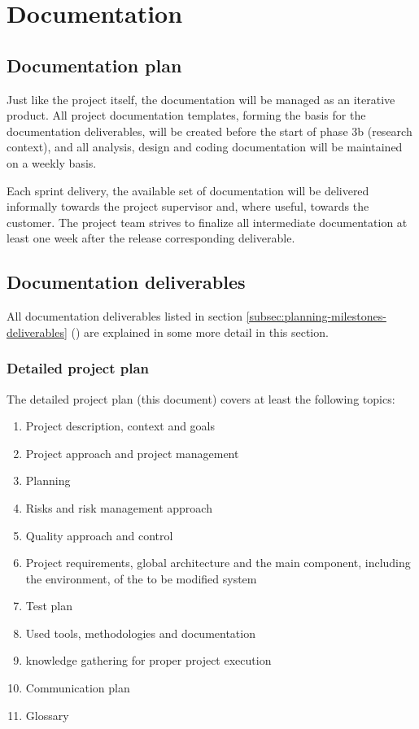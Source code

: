
\section{Documentation}
\label{sec:documentation}
\subsection{Documentation plan}
Just like the project itself, the documentation will be managed as an iterative product.
All project documentation templates, forming the basis for the documentation deliverables, will be created before the start of phase 3b (research context), and all analysis, design and coding documentation will be maintained on a weekly basis.

Each sprint delivery, the available set of documentation will be delivered informally towards the project supervisor and, where useful, towards the customer.
The project team strives to finalize all intermediate documentation at least one week after the release corresponding deliverable.

\subsection{Documentation deliverables}
All documentation deliverables listed in section \ref{subsec:planning-milestones-deliverables} () are explained in some more detail in this section.

\subsubsection{Detailed project plan}
The detailed project plan (this document) covers at least the following topics:

	\begin{enumerate}
		\item Project description, context and goals
		\item Project approach and project management
		\item Planning
		\item Risks and risk management approach
		\item Quality approach and control
		\item Project requirements, global architecture and the main component, including the environment, of the to be modified system
		\item Test plan
		\item Used tools, methodologies and documentation
		\item knowledge gathering for proper project execution
		\item Communication plan
		\item Glossary
	\end {enumerate}

